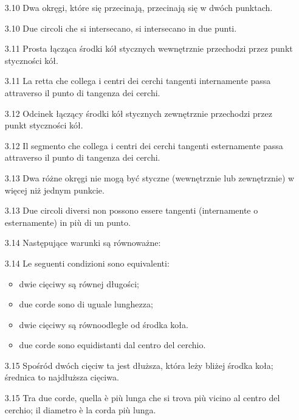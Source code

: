 \begin{enumerate}
    \item [3.10] Dwa okręgi, które się przecinają, przecinają się w dwóch punktach. %
    \item [3.10] Due circoli che si intersecano, si intersecano in due punti. %

    \item [3.11] Prosta łącząca środki kół stycznych wewnętrznie przechodzi przez punkt styczności kół. %
    \item [3.11] La retta che collega i centri dei cerchi tangenti internamente passa attraverso il punto di tangenza dei cerchi. %

    \item [3.12] Odcinek łączący środki kół stycznych zewnętrznie przechodzi przez punkt styczności kół. %
    \item [3.12] Il segmento che collega i centri dei cerchi tangenti esternamente passa attraverso il punto di tangenza dei cerchi. %

    \item [3.13] Dwa różne okręgi nie mogą być styczne (wewnętrznie lub zewnętrznie) w więcej niż jednym punkcie. %
    \item [3.13] Due circoli diversi non possono essere tangenti (internamente o esternamente) in più di un punto. %
    
    \item [3.14] Następujące warunki są równoważne: %
    \item [3.14] Le seguenti condizioni sono equivalenti: %
        \begin{itemize}
        \item dwie cięciwy są równej długości;  %
        \item due corde sono di uguale lunghezza;  %
        \item dwie cięciwy są równoodległe od środka koła. %
        \item due corde sono equidistanti dal centro del cerchio. %
        \end{itemize}

    \item [3.15] Spośród dwóch cięciw ta jest dłuższa, która leży bliżej środka koła; średnica to najdłuższa cięciwa. %
    \item [3.15] Tra due corde, quella è più lunga che si trova più vicino al centro del cerchio; il diametro è la corda più lunga. %


\end{enumerate}
